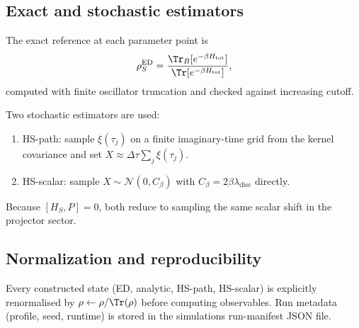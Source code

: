 \subsection{Exact and stochastic estimators}

The exact reference at each parameter point is
\begin{equation}
\rho_S^{\mathrm{ED}}=\frac{\Tr_B[e^{-\beta H_{\mathrm{tot}}}]}{\Tr[e^{-\beta H_{\mathrm{tot}}}]},
\end{equation}
computed with finite oscillator truncation and checked against increasing cutoff.

Two stochastic estimators are used:
\begin{enumerate}
\item HS-path: sample $\xi(\tau_j)$ on a finite imaginary-time grid from the
kernel covariance and set $X\approx\Delta\tau\sum_j\xi(\tau_j)$.
\item HS-scalar: sample $X\sim\mathcal N(0,C_\beta)$ with
$C_\beta=2\beta\lambda_{\mathrm{disc}}$ directly.
\end{enumerate}
Because $[H_S,P]=0$, both reduce to sampling the same scalar shift in the
projector sector.

\subsection{Normalization and reproducibility}

Every constructed state (ED, analytic, HS-path, HS-scalar) is explicitly
renormalised by $\rho\leftarrow\rho/\Tr(\rho)$ before computing observables.
Run metadata (profile, seed, runtime) is stored in the simulations run-manifest
JSON file.
